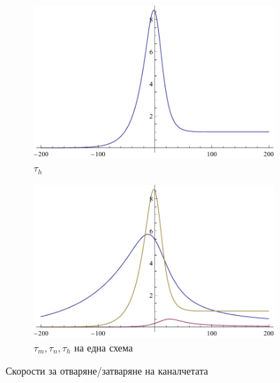 \documentclass{article}
\numberwithin{equation}{section}
\begin{document}
\begin{figure}[H]
\begin{subfigure}[t]{0.3\textwidth}
            \includegraphics[width=\textwidth]{./schemas/th.pdf}
            \caption{$\tau_h$}
        \end{subfigure}
        \begin{subfigure}[t]{0.3\textwidth}
            \includegraphics[width=\textwidth]{./schemas/tcomb.pdf}
            \caption{$ \tau_m, \tau_n, \tau_h$ на една схема}
        \end{subfigure}
        \caption{Скорости за отваряне/затваряне на каналчетата}\label{fig:chanel_prob}
    \end{figure}

    
\end{document}
